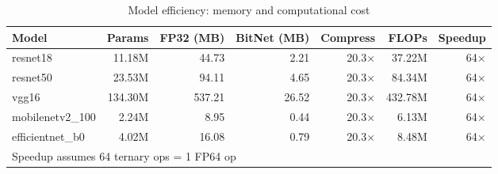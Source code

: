 \begin{table}[h]
\centering
\caption{Model efficiency: memory and computational cost}
\label{tab:efficiency}
\begin{tabular}{lrrrrrr}
\toprule
Model & Params & FP32 (MB) & BitNet (MB) & Compress & FLOPs & Speedup \\
\midrule
resnet18 & 11.18M & 44.73 & 2.21 & 20.3$\times$ & 37.22M & 64$\times$ \\
resnet50 & 23.53M & 94.11 & 4.65 & 20.3$\times$ & 84.34M & 64$\times$ \\
vgg16 & 134.30M & 537.21 & 26.52 & 20.3$\times$ & 432.78M & 64$\times$ \\
mobilenetv2_100 & 2.24M & 8.95 & 0.44 & 20.3$\times$ & 6.13M & 64$\times$ \\
efficientnet_b0 & 4.02M & 16.08 & 0.79 & 20.3$\times$ & 8.48M & 64$\times$ \\
\bottomrule
\multicolumn{7}{l}{\footnotesize Speedup assumes 64 ternary ops = 1 FP64 op} \\
\end{tabular}
\end{table}
